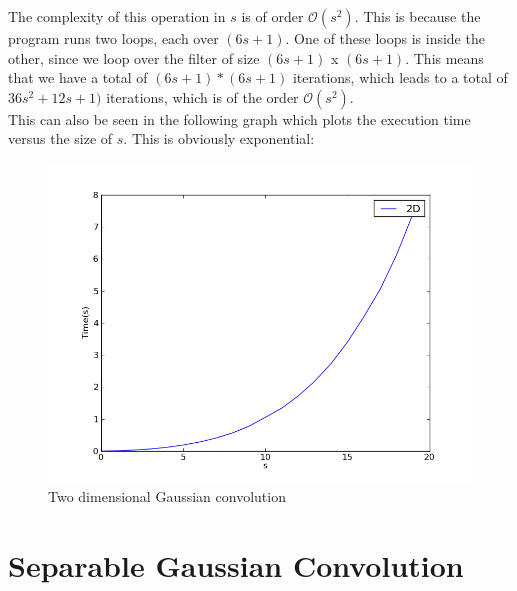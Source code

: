 \documentclass[10pt,a4paper]{article}
\begin{document}
The complexity of this operation in $s$ is of order $\mathcal{O}(s^2)$.
This is because the program runs two loops, each over $(6s + 1)$. One of
these loops is inside the other, since we loop over the filter of size
$(6s + 1)$ x $(6s + 1)$. This means that we have a total of $(6s + 1) * 
(6s + 1)$ iterations, which leads to a total of $36s^2 + 12s + 1)$
iterations, which is of the order $\mathcal{O}(s^2)$.\\
This can also be seen in the following graph which plots the execution
time versus the size of $s$. This is obviously exponential:
\begin{figure}[H]
	\includegraphics[scale=0.4]{2d.png}
	\caption{Two dimensional Gaussian convolution}
\end{figure}

\section{Separable Gaussian Convolution}
\end{document}
